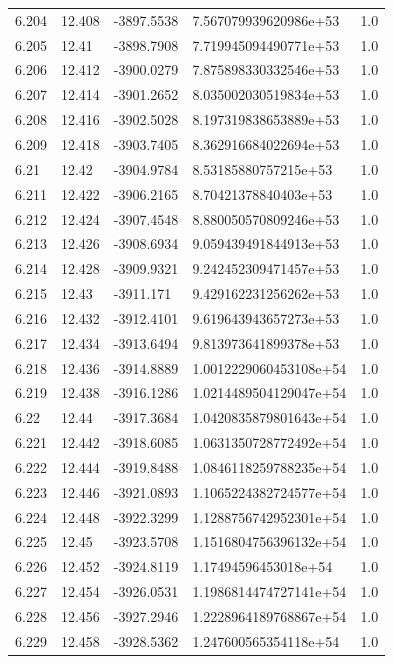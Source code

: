 \begin{tabular}{lllll}
6.204 & 12.408 & -3897.5538 & 7.567079939620986e+53 & 1.0 \\
6.205 & 12.41 & -3898.7908 & 7.719945094490771e+53 & 1.0 \\
6.206 & 12.412 & -3900.0279 & 7.875898330332546e+53 & 1.0 \\
6.207 & 12.414 & -3901.2652 & 8.035002030519834e+53 & 1.0 \\
6.208 & 12.416 & -3902.5028 & 8.197319838653889e+53 & 1.0 \\
6.209 & 12.418 & -3903.7405 & 8.362916684022694e+53 & 1.0 \\
6.21 & 12.42 & -3904.9784 & 8.53185880757215e+53 & 1.0 \\
6.211 & 12.422 & -3906.2165 & 8.70421378840403e+53 & 1.0 \\
6.212 & 12.424 & -3907.4548 & 8.880050570809246e+53 & 1.0 \\
6.213 & 12.426 & -3908.6934 & 9.059439491844913e+53 & 1.0 \\
6.214 & 12.428 & -3909.9321 & 9.242452309471457e+53 & 1.0 \\
6.215 & 12.43 & -3911.171 & 9.429162231256262e+53 & 1.0 \\
6.216 & 12.432 & -3912.4101 & 9.619643943657273e+53 & 1.0 \\
6.217 & 12.434 & -3913.6494 & 9.813973641899378e+53 & 1.0 \\
6.218 & 12.436 & -3914.8889 & 1.0012229060453108e+54 & 1.0 \\
6.219 & 12.438 & -3916.1286 & 1.0214489504129047e+54 & 1.0 \\
6.22 & 12.44 & -3917.3684 & 1.0420835879801643e+54 & 1.0 \\
6.221 & 12.442 & -3918.6085 & 1.0631350728772492e+54 & 1.0 \\
6.222 & 12.444 & -3919.8488 & 1.0846118259788235e+54 & 1.0 \\
6.223 & 12.446 & -3921.0893 & 1.1065224382724577e+54 & 1.0 \\
6.224 & 12.448 & -3922.3299 & 1.1288756742952301e+54 & 1.0 \\
6.225 & 12.45 & -3923.5708 & 1.1516804756396132e+54 & 1.0 \\
6.226 & 12.452 & -3924.8119 & 1.17494596453018e+54 & 1.0 \\
6.227 & 12.454 & -3926.0531 & 1.1986814474727141e+54 & 1.0 \\
6.228 & 12.456 & -3927.2946 & 1.2228964189768867e+54 & 1.0 \\
6.229 & 12.458 & -3928.5362 & 1.247600565354118e+54 & 1.0 \\

\end{tabular}
